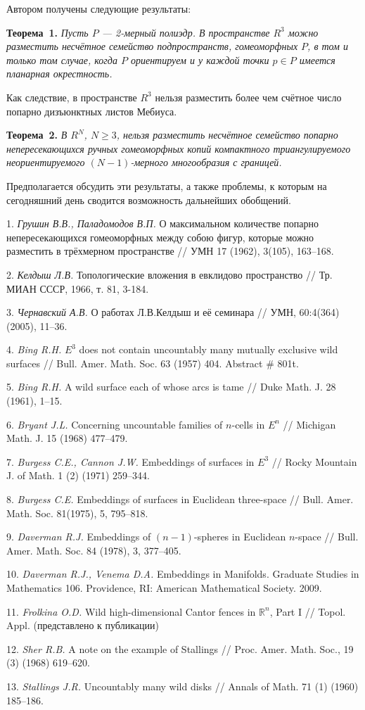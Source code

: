 Автором получены
следующие результаты:

\textbf{Теорема~1.}
{\it Пусть $P$ --- 2-мерный полиэдр.
В пространстве $R^3$ можно разместить несчётное
семейство подпространств, гомеоморфных $P$,
в том и только том случае, когда
$P$ ориентируем и у каждой точки
$p\in P$
имеется планарная окрестность.}

Как следствие, в пространстве $R^3$ нельзя разместить более чем счётное число
попарно дизъюнктных листов Мебиуса.

\textbf{Теорема~2.} {\it
В $R^N$, $N\geqslant 3$,
нельзя разместить несчётное семейство попарно непересекающихся
ручных гомеоморфных копий
компактного триангулируемого
неориентируемого $(N-1)$-мерного многообразия с границей.}

Предполагается обсудить эти результаты,
а также проблемы,
к которым
на сегодняшний день
сводится возможность дальнейших
обобщений.


\litlist

1.
{\it Грушин В.В., Паладомодов В.П.}
О максимальном количестве попарно непересекающихся гомеоморфных между собою фигур, которые можно разместить в трёхмерном пространстве
 // УМН 17 (1962), 3(105), 163--168.

2.
{\it Келдыш Л.В.}
Топологические вложения в евклидово пространство
// Тр. МИАН СССР, 1966,	 т. 81, 3-184.

3.
{\it Чернавский А.В.}
О работах Л.В.Келдыш и её семинара //
УМН, 60:4(364) (2005), 11–36.


4.
{\it Bing R.H.}
$E^3$ does not contain
uncountably many mutually exclusive wild
surfaces //
Bull. Amer. Math. Soc.
63 (1957) 404.
Abstract \# 801t.

5.
{\it Bing R.H.}
A wild surface each of whose arcs is tame //
Duke Math. J. 28 (1961), 1--15.

6.
{\it Bryant J.L.}
Concerning uncountable families of $n$-cells in $E^n$ //
Michigan Math. J. 15 (1968) 477--479.


7.
{\it Burgess C.E., Cannon J.W.}
Embeddings of surfaces in $E^3$ //
Rocky Mountain J. of Math.
1 (2) (1971) 259--344.

8.
{\it Burgess C.E.}
Embeddings of surfaces in Euclidean three-space //
Bull. Amer. Math. Soc.
81(1975), 5, 795--818.

9.
{\it Daverman R.J.}
Embeddings of $(n-1)$-spheres in
Euclidean $n$-space //
Bull. Amer. Math. Soc.
84 (1978), 3, 377--405.

10.
{\it Daverman R.J., Venema D.A.}
Embeddings in Manifolds.
Graduate Studies in Mathematics 106. Providence, RI: American Mathematical Society.
2009.

11.
{\it Frolkina O.D.}
Wild high-dimensional Cantor fences in $\mathbb R^n$, Part I // Topol. Appl.
\foreignlanguage{russian}{
	(представлено к публикации)
}

12.
{\it Sher R.B.}
A note on the example of Stallings //
Proc. Amer. Math. Soc., 19 (3) (1968) 619--620.

13.
{\it Stallings J.R.}
Uncountably many wild disks //
Annals of Math. 71 (1) (1960) 185--186.

